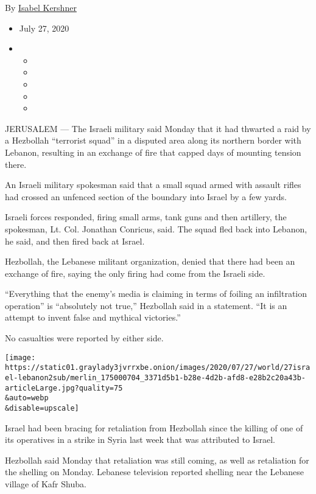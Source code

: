By \href{https://www.nytimes3xbfgragh.onion/by/isabel-kershner}{Isabel
Kershner}

\begin{itemize}
\item
  July 27, 2020
\item
  \begin{itemize}
  \item
  \item
  \item
  \item
  \item
  \end{itemize}
\end{itemize}

JERUSALEM --- The Israeli military said Monday that it had thwarted a
raid by a Hezbollah ``terrorist squad'' in a disputed area along its
northern border with Lebanon, resulting in an exchange of fire that
capped days of mounting tension there.

An Israeli military spokesman said that a small squad armed with assault
rifles had crossed an unfenced section of the boundary into Israel by a
few yards.

Israeli forces responded, firing small arms, tank guns and then
artillery, the spokesman, Lt. Col. Jonathan Conricus, said. The squad
fled back into Lebanon, he said, and then fired back at Israel.

Hezbollah, the Lebanese militant organization, denied that there had
been an exchange of fire, saying the only firing had come from the
Israeli side.

``Everything that the enemy's media is claiming in terms of foiling an
infiltration operation'' is ``absolutely not true,'' Hezbollah said in a
statement. ``It is an attempt to invent false and mythical victories.''

No casualties were reported by either side.

\texttt{[image: https://static01.graylady3jvrrxbe.onion/images/2020/07/27/world/27israel-lebanon2sub/merlin\_175000704\_3371d5b1-b28e-4d2b-afd8-e28b2c20a43b-articleLarge.jpg?quality=75\\\&auto=webp\\\&disable=upscale]}

Israel had been bracing for retaliation from Hezbollah since the killing
of one of its operatives in a strike in Syria last week that was
attributed to Israel.

Hezbollah said Monday that retaliation was still coming, as well as
retaliation for the shelling on Monday. Lebanese television reported
shelling near the Lebanese village of Kafr Shuba.

